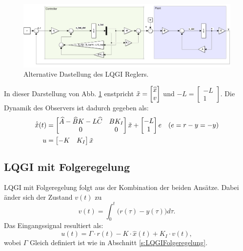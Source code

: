     \begin{figure}[H]
        \centering
        \includegraphics[width = \linewidth]{images/10/LQGI_alt.png}
        \caption{Alternative Dastellung des LQGI Reglers.}
        \label{fig:lqgialt}
    \end{figure}
    In dieser Darstellung von Abb. \ref{fig:lqgialt} enstpricht $\Tilde{x} = \begin{bmatrix}\widehat{x} \\ v\end{bmatrix}$ und $-L = \begin{bmatrix}-L\\ 1\end{bmatrix}$. Die Dynamik des Observers ist dadurch gegeben als:
    \begin{align*}
        \Dot{\Tilde{x}}(t) &= \begin{bmatrix} \widehat{A}-\widehat{B}K - L\widehat{C} & BK_I\\
        0 & 0
        \end{bmatrix}\Tilde{x} + \begin{bmatrix} -L \\ 1\end{bmatrix} e \quad (e = r-y = -y)\\
        u &= \begin{bmatrix} -K & K_I \end{bmatrix}\Tilde{x}
    \end{align*}
        
\subsection{LQGI mit Folgeregelung}
    LQGI mit Folgeregelung folgt aus der Kombination der beiden Ansätze. Dabei änder sich der Zustand $v(t)$ zu
    \begin{equation*}
        v(t) = \int_0^t \big(r(\tau)-y(\tau)\big)d\tau.
    \end{equation*}
    Das Eingangssignal resultiert als:
    \begin{equation*}
        u(t) = \mathit{\Gamma}\cdot r(t) - K \cdot\widehat{x}(t)+K_I\cdot v(t),
    \end{equation*}
    wobei $ \mathit{\Gamma}$ Gleich definiert ist wie in Abschnitt \ref{s:LQGIFolgeregelung}.
    
